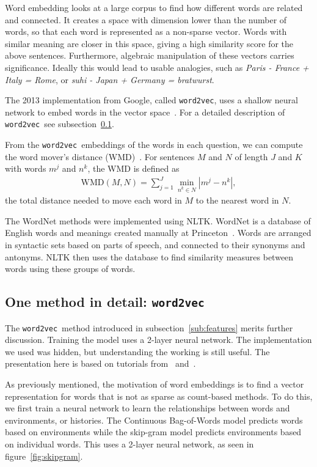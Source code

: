 \documentclass{article} %
\newcommand{\wordtvec}{\texttt{word2vec}}
\begin{document}
Word embedding looks at a large corpus to find how different words are related and connected. It creates a space with dimension lower than the number of words, so that each word is represented as a non-sparse vector. Words with similar meaning are closer in this space, giving a high similarity score for the above sentences. Furthermore, algebraic manipulation of these vectors carries significance. Ideally this would lead to usable analogies, such as \textit{Paris - France + Italy = Rome}, or \textit{suhi - Japan + Germany = bratwurst}.

The 2013 implementation from Google, called \wordtvec, uses a shallow neural network to embed words in the vector space~\cite{word2vec}. For a detailed description of \wordtvec\ see subsection~\ref{sub:detail}.

From the \wordtvec\ embeddings of the words in each question, we can compute the word mover's distance (WMD)~\cite{kusner15}. For sentences $M$ and $N$ of length $J$ and $K$ with words $m^j$ and $n^k$, the WMD is defined as 
\begin{align}
\text{WMD}(M,N) = \sum_{j=1}^J\min_{n^k\in N}\left|m^j-n^k\right|,
\end{align}
the total distance needed to move each word in $M$ to the nearest word in $N$.

The WordNet methods were implemented using NLTK. WordNet is a database of English words and meanings created manually at Princeton~\cite{wordnet}. Words are arranged in syntactic sets based on parts of speech, and connected to their synonyms and antonyms. NLTK then uses the database to find similarity measures between words using these groups of words. 

\subsection{One method in detail: \wordtvec} \label{sub:detail}

The \wordtvec\ method introduced in subsection~\ref{sub:features} merits further discussion. Training the model uses a 2-layer neural network. The implementation we used was hidden, but understanding the working is still useful. The presentation here is based on tutorials from~\cite{tensorflow} and~\cite{mccormick}.

As previously mentioned, the motivation of word embeddings is to find a vector representation for words that is not as sparse as count-based methods. To do this, we first train a neural network to learn the relationships between words and environments, or histories. The Continuous Bag-of-Words model predicts words based on environments while the skip-gram model predicts environments based on individual words. This uses a 2-layer neural network, as seen in figure~\ref{fig:skipgram}. 
\end{document}
